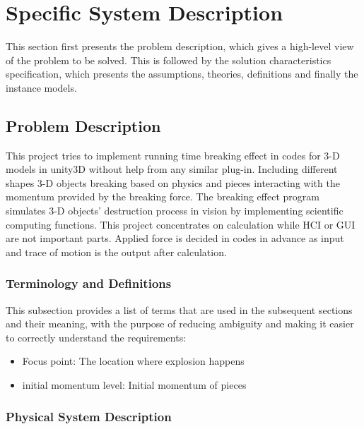 \documentclass[12pt]{article}
\begin{document}
	\section{Specific System Description}
	
	This section first presents the problem description, which gives a high-level
	view of the problem to be solved.  This is followed by the solution characteristics
	specification, which presents the assumptions, theories, definitions and finally
	the instance models. 
	
	\subsection{Problem Description} \label{Sec_pd}
	
	This project tries to implement running time breaking effect in codes for 3-D models in unity3D without help from any similar plug-in. Including different shapes 3-D objects breaking based on physics and pieces interacting with the momentum provided by the breaking force. The breaking effect program simulates 3-D objects’ destruction process in vision by implementing scientific computing functions. This project concentrates on calculation while HCI or GUI are not important parts. Applied force is decided in codes in advance as input and trace of motion is the output after calculation.
	
	\subsubsection{Terminology and  Definitions}
	
	This subsection provides a list of terms that are used in the subsequent
	sections and their meaning, with the purpose of reducing ambiguity and making it
	easier to correctly understand the requirements:
	
	\begin{itemize}
		
		\item Focus point: The location where explosion happens 
		\item initial momentum level: Initial momentum of pieces  
		
	\end{itemize}
	
	\subsubsection{Physical System Description}
	
\end{document}
